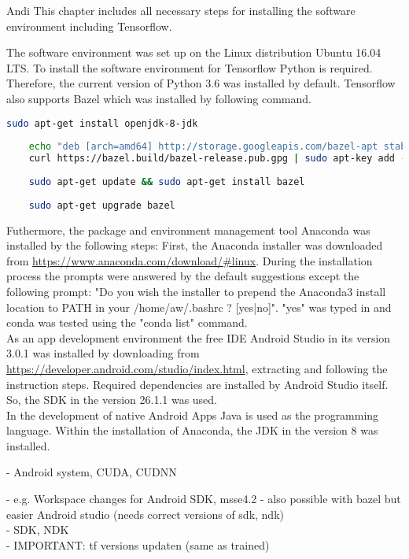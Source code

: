 	 Andi
This chapter includes all necessary steps for installing the software environment including Tensorflow.

The software environment was set up on the Linux distribution Ubuntu 16.04 LTS. To install the software environment for Tensorflow Python is required. Therefore, the current version of Python 3.6 was installed by default. Tensorflow also supports Bazel which was installed by following command.

\begin{lstlisting}[caption=Bazel Installation, label=list:bazel, language=bash]
	sudo apt-get install openjdk-8-jdk
	
	echo "deb [arch=amd64] http://storage.googleapis.com/bazel-apt stable jdk1.8" | sudo tee /etc/apt/				sources.list.d/bazel.list
	curl https://bazel.build/bazel-release.pub.gpg | sudo apt-key add -
	
	sudo apt-get update && sudo apt-get install bazel
	
	sudo apt-get upgrade bazel
\end{lstlisting}	

Futhermore, the package and environment management tool Anaconda was installed by the following steps:
First, the Anaconda installer was downloaded from \url{https://www.anaconda.com/download/#linux}. During the installation process the prompts were answered by the default suggestions except the following prompt: "Do you wish the installer to prepend the Anaconda3 install location to PATH in your /home/aw/.bashrc ? [yes|no]". "yes" was typed in and conda was tested using the "conda list" command. \\

As an app development environment the free IDE Android Studio in its version 3.0.1 was installed by downloading from \url{https://developer.android.com/studio/index.html}, extracting and following the instruction steps. Required dependencies are installed by Android Studio itself. So, the SDK in the version 26.1.1 was used. \\

In the development of native Android Apps Java is used as the programming language. Within the installation of Anaconda, the JDK in the version 8 was installed.

 	- Android system, CUDA, CUDNN
 	
				- e.g. Workspace changes for Android SDK, msse4.2
				- also possible with bazel but easier Android studio (needs correct versions of sdk, ndk) \\
				- SDK, NDK \\
				- IMPORTANT: tf versions updaten (same as trained)

